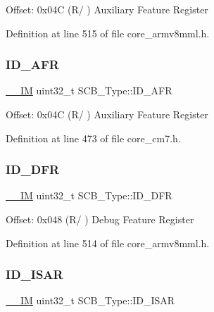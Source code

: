 Offset\+: 0x04C (R/ ) Auxiliary Feature Register 

Definition at line 515 of file core\+\_\+armv8mml.\+h.

\mbox{\label{struct_s_c_b___type_a9c9a1d805f8e99b9fd3ab4f455b6333a}} 
\subsubsection{\texorpdfstring{I\+D\+\_\+\+A\+FR}{ID\_AFR}}
{\footnotesize\ttfamily \hyperlink{core__sc300_8h_a4cc1649793116d7c2d8afce7a4ffce43}{\+\_\+\+\_\+\+IM} uint32\+\_\+t S\+C\+B\+\_\+\+Type\+::\+I\+D\+\_\+\+A\+FR}

Offset\+: 0x04C (R/ ) Auxiliary Feature Register 

Definition at line 473 of file core\+\_\+cm7.\+h.

\mbox{\label{struct_s_c_b___type_ada1d3119c020983fdc949c2ccd406caa}} 
\subsubsection{\texorpdfstring{I\+D\+\_\+\+D\+FR}{ID\_DFR}}
{\footnotesize\ttfamily \hyperlink{core__sc300_8h_a4cc1649793116d7c2d8afce7a4ffce43}{\+\_\+\+\_\+\+IM} uint32\+\_\+t S\+C\+B\+\_\+\+Type\+::\+I\+D\+\_\+\+D\+FR}

Offset\+: 0x048 (R/ ) Debug Feature Register 

Definition at line 514 of file core\+\_\+armv8mml.\+h.

\mbox{\label{struct_s_c_b___type_a5be03d185d9bde32c5b9028f792f8e1e}} 
\subsubsection{\texorpdfstring{I\+D\+\_\+\+I\+S\+AR}{ID\_ISAR}}
{\footnotesize\ttfamily \hyperlink{core__sc300_8h_a4cc1649793116d7c2d8afce7a4ffce43}{\+\_\+\+\_\+\+IM} uint32\+\_\+t S\+C\+B\+\_\+\+Type\+::\+I\+D\+\_\+\+I\+S\+AR}

